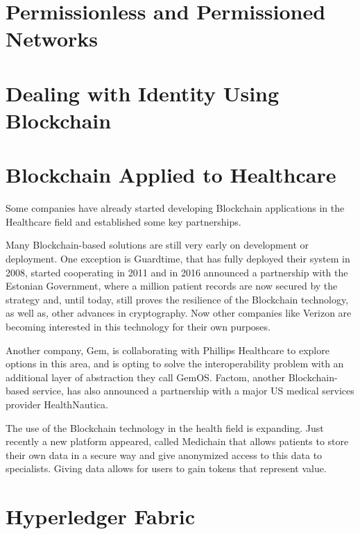 \section{Permissionless and Permissioned Networks}

\section{Dealing with Identity Using Blockchain}

\section{Blockchain Applied to Healthcare}

Some companies have already started developing Blockchain applications in the
Healthcare field and established some key partnerships.

Many Blockchain-based solutions are still very early on development or
deployment.  One exception is Guardtime, that has fully deployed their system
in 2008, started cooperating in 2011 and in 2016 announced a partnership with
the Estonian Government, where a million patient records are now secured by the
strategy and, until today, still proves the resilience of the Blockchain
technology, as well as, other advances in cryptography.  Now other companies
like Verizon are becoming interested in this technology for their own purposes.
\cite{GuardTime2018,EstonianGovernmentGuardTime2016}

Another company, Gem, is collaborating with Phillips Healthcare to explore
options in this area, and is opting to solve the interoperability problem with
an additional layer of abstraction they call GemOS.  Factom, another
Blockchain-based service, has also announced a partnership with a major US
medical services provider
HealthNautica.\cite{BlockchainCompHealth2017,FactomPartnership2017}

The use of the Blockchain technology in the health field is expanding. Just
recently a new platform appeared, called Medichain that allows patients to
store their own data in a secure way and give anonymized access to this data to
specialists. Giving data allows for users to gain tokens that represent value.
\cite{MediChain2018}

\section{Hyperledger Fabric}
